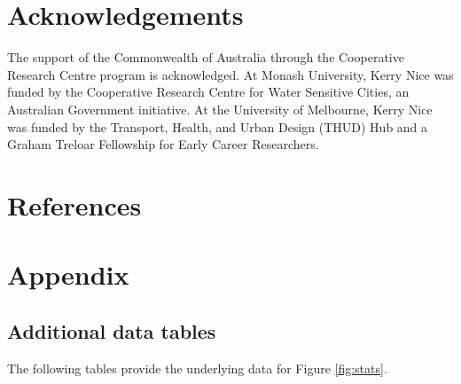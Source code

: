 \documentclass[final,3p,times,authoryear]{elsarticle}
\begin{document}

\section*{Acknowledgements}
The support of the Commonwealth of Australia through the Cooperative Research Centre program is acknowledged. At Monash University, Kerry Nice was funded by the Cooperative Research Centre for Water Sensitive Cities, an Australian Government initiative. At the University of Melbourne, Kerry Nice was funded by the Transport, Health, and Urban Design (THUD) Hub and a Graham Treloar Fellowship for Early Career Researchers.
 

\section*{References}\label{sec:ref}
   
  


%
%
%





\section{Appendix}\label{sec:app}  
\subsection{Additional data tables}\label{app:tables}  
The following tables provide the underlying data for Figure \ref{fig:stats}.
\end{document}
